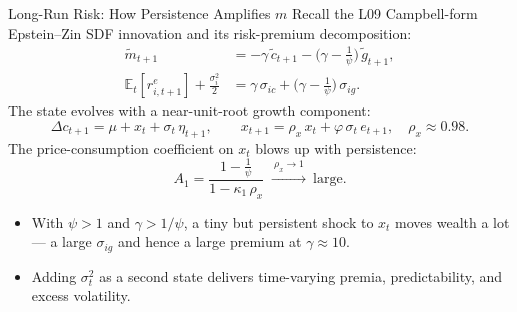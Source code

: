 \documentclass{beamer}
\newcommand{\E}{\mathbb{E}}
\newcommand{\tld}[1]{\widetilde{#1}}
\begin{document}
\begin{frame}{Long-Run Risk: How Persistence Amplifies $m$}
\justifying
Recall the L09 Campbell-form Epstein--Zin SDF innovation and its risk-premium decomposition:
\begin{align*}
\tld{m}_{t+1} &= -\gamma\,\tld{c}_{t+1}-\Big(\gamma-\tfrac{1}{\psi}\Big)\,\tld{g}_{t+1},\\
\E_t[r^e_{i,t+1}]+\tfrac{\sigma_i^2}{2}
 &= \gamma\,\sigma_{ic}+\Big(\gamma-\tfrac{1}{\psi}\Big)\,\sigma_{ig}.
\end{align*}
The state evolves with a near-unit-root growth component:
\begin{equation*}
\Delta c_{t+1}=\mu+x_t+\sigma_t\,\eta_{t+1},\qquad
x_{t+1}=\rho_x\,x_t+\varphi\,\sigma_t\,e_{t+1},\quad \rho_x\approx 0.98 .
\end{equation*}
The price-consumption coefficient on $x_t$ blows up with persistence:
\begin{equation*}
A_1=\frac{1-\tfrac{1}{\psi}}{1-\kappa_1\,\rho_x}
\;\xrightarrow{\ \rho_x\to 1\ }\ \text{large.}
\end{equation*}
\begin{itemize}\small
\item With $\psi>1$ and $\gamma>1/\psi$, a tiny but persistent shock to $x_t$ moves \alert{wealth} a lot --- a large $\sigma_{ig}$ and hence a large premium at $\gamma\approx 10$.
\item Adding $\sigma_t^2$ as a second state delivers \alert{time-varying} premia, predictability, and excess volatility.
\end{itemize}
\end{frame}
\end{document}
